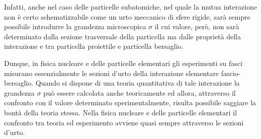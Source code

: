 Infatti, anche nel caso delle particelle subatomiche, nel quale la mutua
interazione non è certo schematizzabile come un urto meccanico di sfere
rigide, sarà sempre possibile introdurre la grandezza microscopica
\(\sigma\) il cui valore, però, non sarà determinato dalla sezione
trasversale della particella ma dalle proprietà della interazione e tra
particella proiettile e particella bersaglio.

Dunque, in fisica nucleare e delle particelle elementari gli esperimenti
su fasci misurano essenzialmente le sezioni d'urto della interazione
elementare fascio-bersaglio.
Quando si dispone di una teoria
quantitativa di tale interazione la grandezza $\sigma$ può essere
calcolata anche teoricamente ed allora, attraverso il confronto con il
valore determinato sperimentalmente, risulta possibile saggiare la bontà
della teoria stessa.
Nella fisica nucleare e delle particelle elementari
il confronto tra teoria ed esperimento avviene quasi sempre attraverso
le sezioni d'urto.

